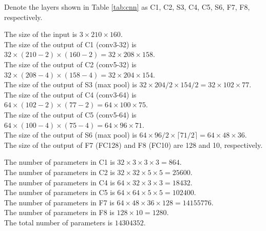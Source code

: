 \begin{exercise}
\begin{enumerate}
            \begin{solution}
                Denote the layers shown in Table \ref{tab:cnn} as C1, C2, S3, C4, C5, S6, F7, F8, respectively.

                The size of the input is $3 \times 210 \times 160$. \\
                The size of the output of C1 (conv3-32) is $32 \times (210 - 2) \times (160 - 2) = 32 \times 208 \times 158$. \\
                The size of the output of C2 (conv5-32) is $32 \times (208 - 4) \times (158 - 4) = 32 \times 204 \times 154$. \\
                The size of the output of S3 (max pool) is $32 \times 204 / 2 \times 154 / 2 = 32 \times 102 \times 77$. \\
                The size of the output of C4 (conv3-64) is $64 \times (102 - 2) \times (77 - 2) = 64 \times 100 \times 75$. \\
                The size of the output of C5 (conv5-64) is $64 \times (100 - 4) \times (75 - 4) = 64 \times 96 \times 71$. \\
                The size of the output of S6 (max pool) is $64 \times 96 / 2 \times \lceil 71 / 2 \rceil = 64 \times 48 \times 36$. \\
                The size of the output of F7 (FC128) and F8 (FC10) are 128 and 10, respectively.

                The number of parameters in C1 is $32 \times 3 \times 3 \times 3 = 864$. \\
                The number of parameters in C2 is $32 \times 32 \times 5 \times 5 = 25600$. \\
                The number of parameters in C4 is $64 \times 32 \times 3 \times 3 = 18432$. \\
                The number of parameters in C5 is $64 \times 64 \times 5 \times 5 = 102400$. \\
                The number of parameters in F7 is $64 \times 48 \times 36 \times 128 = 14155776$. \\
                The number of parameters in F8 is $128 \times 10 = 1280$. \\
                The total number of parameters is $14304352$. \qedhere
            \end{solution}

    \end{enumerate}
\end{exercise}

